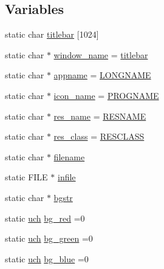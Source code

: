 \subsection*{Variables}
\begin{DoxyCompactItemize}
\item 
static char \mbox{\hyperlink{rpng-x_8c_a7d71fb2a6cfb5d27855f58bc7e548978}{titlebar}} \mbox{[}1024\mbox{]}
\item 
static char $\ast$ \mbox{\hyperlink{rpng-x_8c_ad98b89261d368fd018f2d8de359b6863}{window\+\_\+name}} = \mbox{\hyperlink{rpng2-x_8c_a7d71fb2a6cfb5d27855f58bc7e548978}{titlebar}}
\item 
static char $\ast$ \mbox{\hyperlink{rpng-x_8c_a9db0329b02c3e8e0260939a1c680738a}{appname}} = \mbox{\hyperlink{_visual_png_8c_ae8176192ea4d52bb0acbcfeaaffb3bd8}{L\+O\+N\+G\+N\+A\+ME}}
\item 
static char $\ast$ \mbox{\hyperlink{rpng-x_8c_a2f4fb0c5d67793c3073266f0d247a33d}{icon\+\_\+name}} = \mbox{\hyperlink{_visual_png_8c_a8c9afb758de9a0355c93fc926b8ce6b1}{P\+R\+O\+G\+N\+A\+ME}}
\item 
static char $\ast$ \mbox{\hyperlink{rpng-x_8c_ae178e0b707bb083445446bacf79138f0}{res\+\_\+name}} = \mbox{\hyperlink{rpng2-x_8c_a26d3cf6f35fd25b054ff41b03368b31b}{R\+E\+S\+N\+A\+ME}}
\item 
static char $\ast$ \mbox{\hyperlink{rpng-x_8c_a0aeb2856c5f54c1744e73632e7c595b7}{res\+\_\+class}} = \mbox{\hyperlink{rpng2-x_8c_a3b0a2ac91fca697e3acedd9903efd4fd}{R\+E\+S\+C\+L\+A\+SS}}
\item 
static char $\ast$ \mbox{\hyperlink{rpng-x_8c_aeac90097f29f7529968697163cea5c18}{filename}}
\item 
static F\+I\+LE $\ast$ \mbox{\hyperlink{rpng-x_8c_af19157da745ecb3f2b088c8f3a10c0a7}{infile}}
\item 
static char $\ast$ \mbox{\hyperlink{rpng-x_8c_af197c1438afe61953ac3b79cdde82caa}{bgstr}}
\item 
static \mbox{\hyperlink{readpng_8h_af3307af5922c72924a837559c801a8a4}{uch}} \mbox{\hyperlink{rpng-x_8c_a11a1f227fa7e010da3dd91c95288d25c}{bg\+\_\+red}} =0
\item 
static \mbox{\hyperlink{readpng_8h_af3307af5922c72924a837559c801a8a4}{uch}} \mbox{\hyperlink{rpng-x_8c_acb75e759bae104f88e4d759ff420f01a}{bg\+\_\+green}} =0
\item 
static \mbox{\hyperlink{readpng_8h_af3307af5922c72924a837559c801a8a4}{uch}} \mbox{\hyperlink{rpng-x_8c_a72e59a2a673bbf5e1b2a442e846cb30f}{bg\+\_\+blue}} =0
\item 

\end{DoxyCompactItemize}
